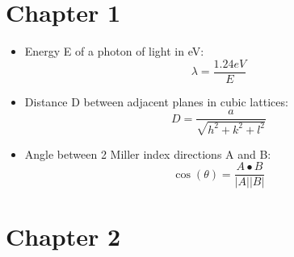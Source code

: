 \documentclass{article}
\begin{document}
\section{Chapter 1}
\begin{itemize}
\item Energy E of a photon of light in eV: $$\lambda = \frac{1.24eV}{E}$$
\item Distance D between adjacent planes in cubic lattices: $$D = \frac{a}{\sqrt{ h^2 + k^2 + l^2} }$$
\item Angle between 2 Miller index directions A and B: $$\cos(\theta) = \frac{A\bullet B}{|A| |B|}$$
\end{itemize}

\section{Chapter 2}
\end{document}
